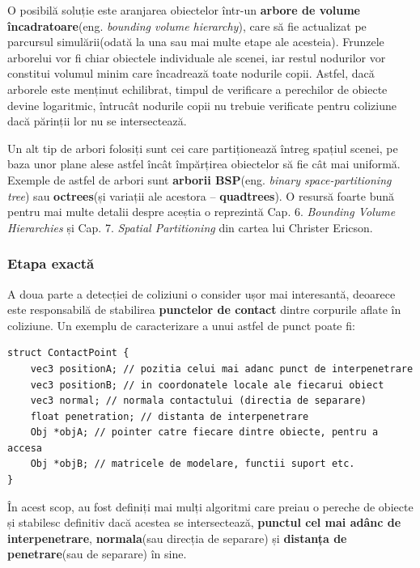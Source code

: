 \documentclass[12pt,a4paper]{report}
\begin{document}
O posibilă soluție este aranjarea obiectelor într-un \textbf{arbore de volume încadratoare}(eng. \textit{bounding volume hierarchy}), care să fie actualizat pe parcursul simulării(odată la una sau mai multe etape ale acesteia). Frunzele arborelui vor fi chiar obiectele individuale ale scenei, iar restul nodurilor vor constitui volumul minim care încadrează toate nodurile copii. Astfel, dacă arborele este menținut echilibrat, timpul de verificare a perechilor de obiecte devine logaritmic, întrucât nodurile copii nu trebuie verificate pentru coliziune dacă părinții lor nu se intersectează.

Un alt tip de arbori folosiți sunt cei care partiționează întreg spațiul scenei, pe baza unor plane alese astfel încât împărțirea obiectelor să fie cât mai uniformă. Exemple de astfel de arbori sunt \textbf{arborii BSP}(eng. \textit{binary space-partitioning tree}) sau \textbf{octrees}(și variații ale acestora -- \textbf{quadtrees}). O resursă foarte bună pentru mai multe detalii despre aceștia o reprezintă Cap. 6. \textit{Bounding Volume Hierarchies} și Cap. 7. \textit{Spatial Partitioning} din cartea\cite{real_time_collision_detection} lui Christer Ericson.

\subsubsection{Etapa exactă}
A doua parte a detecției de coliziuni o consider ușor mai interesantă, deoarece este responsabilă de stabilirea \textbf{punctelor de contact} dintre corpurile aflate în coliziune. Un exemplu de caracterizare a unui astfel de punct poate fi:
\begin{lstlisting}[style=myC++]
struct ContactPoint {
	vec3 positionA; // pozitia celui mai adanc punct de interpenetrare
	vec3 positionB; // in coordonatele locale ale fiecarui obiect
	vec3 normal; // normala contactului (directia de separare)
	float penetration; // distanta de interpenetrare
	Obj *objA; // pointer catre fiecare dintre obiecte, pentru a accesa
	Obj *objB; // matricele de modelare, functii suport etc.
}
\end{lstlisting}
În acest scop, au fost definiți mai mulți algoritmi care preiau o pereche de obiecte și stabilesc definitiv dacă acestea se intersectează, \textbf{punctul cel mai adânc de interpenetrare}, \textbf{normala}(sau direcția de separare) și \textbf{distanța de penetrare}(sau de separare) în sine.
\end{document}
